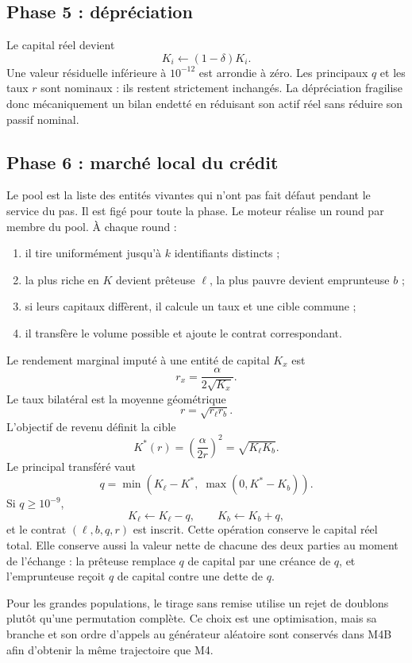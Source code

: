\documentclass[11pt,a4paper]{article}
\begin{document}
\subsection{Phase 5 : dépréciation}

Le capital réel devient
\[
K_i\leftarrow(1-\delta)K_i.
\]
Une valeur résiduelle inférieure à $10^{-12}$ est arrondie à zéro. Les
principaux $q$ et les taux $r$ sont nominaux : ils restent strictement
inchangés. La dépréciation fragilise donc mécaniquement un bilan endetté en
réduisant son actif réel sans réduire son passif nominal.

\subsection{Phase 6 : marché local du crédit}

Le pool est la liste des entités vivantes qui n'ont pas fait défaut pendant
le service du pas. Il est figé pour toute la phase. Le moteur réalise un
round par membre du pool. À chaque round :

\begin{enumerate}
\item il tire uniformément jusqu'à $k$ identifiants distincts ;
\item la plus riche en $K$ devient prêteuse $\ell$, la plus pauvre devient
  emprunteuse $b$ ;
\item si leurs capitaux diffèrent, il calcule un taux et une cible commune ;
\item il transfère le volume possible et ajoute le contrat correspondant.
\end{enumerate}

Le rendement marginal imputé à une entité de capital $K_x$ est
\[
r_x=\frac{\alpha}{2\sqrt{K_x}}.
\]
Le taux bilatéral est la moyenne géométrique
\[
r=\sqrt{r_\ell r_b}.
\]
L'objectif de revenu définit la cible
\[
K^*(r)=\left(\frac{\alpha}{2r}\right)^2
=\sqrt{K_\ell K_b}.
\]
Le principal transféré vaut
\[
q=\min\!\left(K_\ell-K^*,\;\max(0,K^*-K_b)\right).
\]
Si $q\geq10^{-9}$,
\[
K_\ell\leftarrow K_\ell-q,
\qquad
K_b\leftarrow K_b+q,
\]
et le contrat $(\ell,b,q,r)$ est inscrit. Cette opération conserve le
capital réel total. Elle conserve aussi la valeur nette de chacune des deux
parties au moment de l'échange : la prêteuse remplace $q$ de capital par une
créance de $q$, et l'emprunteuse reçoit $q$ de capital contre une dette de
$q$.

Pour les grandes populations, le tirage sans remise utilise un rejet de
doublons plutôt qu'une permutation complète. Ce choix est une optimisation,
mais sa branche et son ordre d'appels au générateur aléatoire sont conservés
dans M4B afin d'obtenir la même trajectoire que M4.
\end{document}
